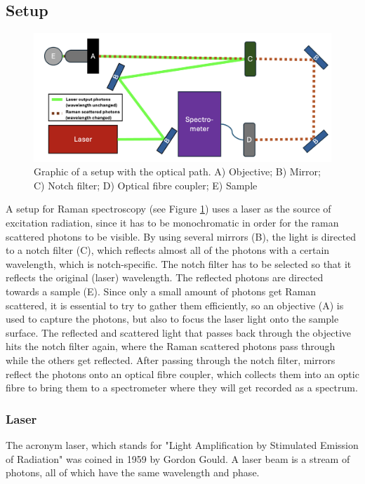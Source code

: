 \subsection{Setup}

\begin{figure}[ht]
    \centering
    \includegraphics[width=\textwidth]{images/setup_graphics/setup_graphic.png}
    \caption{Graphic of a setup with the optical path. A) Objective; B) Mirror; C) Notch filter; D) Optical fibre coupler; E) Sample}
    \label{fig:setup_graphic}
\end{figure}

A setup for Raman spectroscopy (see Figure \ref{fig:setup_graphic}) uses a laser as the source of excitation radiation, since it has to be monochromatic in order for the raman scattered photons to be visible. By using several mirrors (B), the light is directed to a notch filter (C), which reflects almost all of the photons with a certain wavelength, which is notch-specific. The notch filter has to be selected so that it reflects the original (laser) wavelength. The reflected photons are directed towards a sample (E). Since only a small amount of photons get Raman scattered, it is essential to try to gather them efficiently, so an objective (A) is used to capture the photons, but also to focus the laser light onto the sample surface. The reflected and scattered light that passes back through the objective hits the notch filter again, where the Raman scattered photons pass through while the others get reflected. After passing through the notch filter, mirrors reflect the photons onto an optical fibre coupler, which collects them into an optic fibre to bring them to a spectrometer where they will get recorded as a spectrum.

\newpage

\subsubsection{Laser}
The acronym laser, which stands for "Light Amplification by Stimulated Emission of Radiation" was coined in 1959 by Gordon Gould.
A laser beam is a stream of photons, all of which have the same wavelength and phase. 


